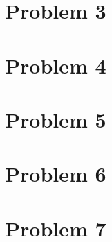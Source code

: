 \documentclass{article}
\begin{document}
\section{Problem 3}
\label{sec:org03a3502}
\section{Problem 4}
\label{sec:org01f92e7}
\section{Problem 5}
\label{sec:orgf8fb051}
\section{Problem 6}
\label{sec:org7667dec}
\section{Problem 7}
\label{sec:orgc9ac972}
\end{document}
